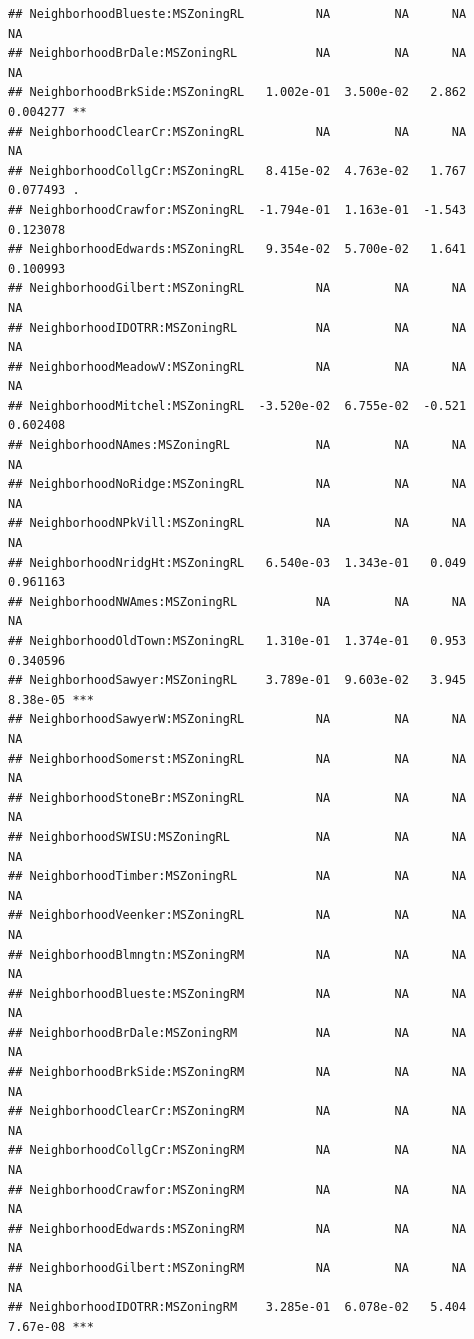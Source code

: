 \documentclass[american,]{article}
\theoremstyle{definition}
\theoremstyle{definition}
\theoremstyle{definition}
\theoremstyle{remark}
\begin{document}
\begin{verbatim}
## NeighborhoodBlueste:MSZoningRL          NA         NA      NA       NA    
## NeighborhoodBrDale:MSZoningRL           NA         NA      NA       NA    
## NeighborhoodBrkSide:MSZoningRL   1.002e-01  3.500e-02   2.862 0.004277 ** 
## NeighborhoodClearCr:MSZoningRL          NA         NA      NA       NA    
## NeighborhoodCollgCr:MSZoningRL   8.415e-02  4.763e-02   1.767 0.077493 .  
## NeighborhoodCrawfor:MSZoningRL  -1.794e-01  1.163e-01  -1.543 0.123078    
## NeighborhoodEdwards:MSZoningRL   9.354e-02  5.700e-02   1.641 0.100993    
## NeighborhoodGilbert:MSZoningRL          NA         NA      NA       NA    
## NeighborhoodIDOTRR:MSZoningRL           NA         NA      NA       NA    
## NeighborhoodMeadowV:MSZoningRL          NA         NA      NA       NA    
## NeighborhoodMitchel:MSZoningRL  -3.520e-02  6.755e-02  -0.521 0.602408    
## NeighborhoodNAmes:MSZoningRL            NA         NA      NA       NA    
## NeighborhoodNoRidge:MSZoningRL          NA         NA      NA       NA    
## NeighborhoodNPkVill:MSZoningRL          NA         NA      NA       NA    
## NeighborhoodNridgHt:MSZoningRL   6.540e-03  1.343e-01   0.049 0.961163    
## NeighborhoodNWAmes:MSZoningRL           NA         NA      NA       NA    
## NeighborhoodOldTown:MSZoningRL   1.310e-01  1.374e-01   0.953 0.340596    
## NeighborhoodSawyer:MSZoningRL    3.789e-01  9.603e-02   3.945 8.38e-05 ***
## NeighborhoodSawyerW:MSZoningRL          NA         NA      NA       NA    
## NeighborhoodSomerst:MSZoningRL          NA         NA      NA       NA    
## NeighborhoodStoneBr:MSZoningRL          NA         NA      NA       NA    
## NeighborhoodSWISU:MSZoningRL            NA         NA      NA       NA    
## NeighborhoodTimber:MSZoningRL           NA         NA      NA       NA    
## NeighborhoodVeenker:MSZoningRL          NA         NA      NA       NA    
## NeighborhoodBlmngtn:MSZoningRM          NA         NA      NA       NA    
## NeighborhoodBlueste:MSZoningRM          NA         NA      NA       NA    
## NeighborhoodBrDale:MSZoningRM           NA         NA      NA       NA    
## NeighborhoodBrkSide:MSZoningRM          NA         NA      NA       NA    
## NeighborhoodClearCr:MSZoningRM          NA         NA      NA       NA    
## NeighborhoodCollgCr:MSZoningRM          NA         NA      NA       NA    
## NeighborhoodCrawfor:MSZoningRM          NA         NA      NA       NA    
## NeighborhoodEdwards:MSZoningRM          NA         NA      NA       NA    
## NeighborhoodGilbert:MSZoningRM          NA         NA      NA       NA    
## NeighborhoodIDOTRR:MSZoningRM    3.285e-01  6.078e-02   5.404 7.67e-08 ***

\end{verbatim}
\end{document}
